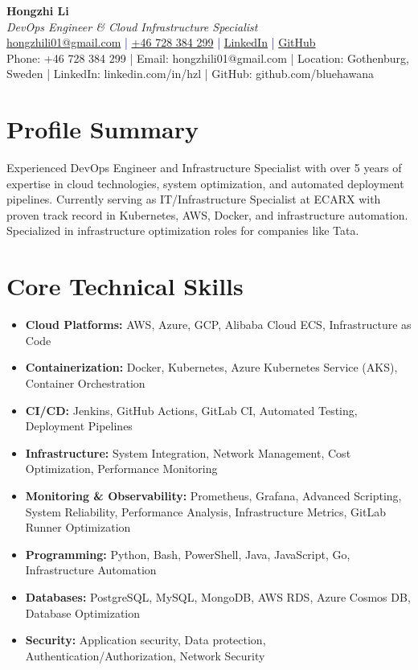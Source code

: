 \documentclass[11pt,a4paper]{article}
\begin{document}
\pagestyle{empty} %

\begin{center}
{\LARGE \textbf{Hongzhi Li}}\\[10pt]
{\Large \textit{DevOps Engineer \& Cloud Infrastructure Specialist}}\\[10pt]
\textcolor{darkblue}{\href{mailto:hongzhili01@gmail.com}{hongzhili01@gmail.com} | \href{tel:+46728384299}{+46 728 384 299} | \href{https://www.linkedin.com/in/hzl/}{LinkedIn} | \href{https://github.com/bluehawana}{GitHub}}
\\[6pt]
Phone: +46 728 384 299 | Email: hongzhili01@gmail.com | Location: Gothenburg, Sweden | LinkedIn: linkedin.com/in/hzl | GitHub: github.com/bluehawana
\end{center}

\section*{Profile Summary}
Experienced DevOps Engineer and Infrastructure Specialist with over 5 years of expertise in cloud technologies, system optimization, and automated deployment pipelines. Currently serving as IT/Infrastructure Specialist at ECARX with proven track record in Kubernetes, AWS, Docker, and infrastructure automation. Specialized in infrastructure optimization roles for companies like Tata.

\section*{Core Technical Skills}
\begin{itemize}[noitemsep]
\item \textbf{Cloud Platforms:} AWS, Azure, GCP, Alibaba Cloud ECS, Infrastructure as Code
\item \textbf{Containerization:} Docker, Kubernetes, Azure Kubernetes Service (AKS), Container Orchestration
\item \textbf{CI/CD:} Jenkins, GitHub Actions, GitLab CI, Automated Testing, Deployment Pipelines
\item \textbf{Infrastructure:} System Integration, Network Management, Cost Optimization, Performance Monitoring
\item \textbf{Monitoring \& Observability:} Prometheus, Grafana, Advanced Scripting, System Reliability, Performance Analysis, Infrastructure Metrics, GitLab Runner Optimization
\item \textbf{Programming:} Python, Bash, PowerShell, Java, JavaScript, Go, Infrastructure Automation
\item \textbf{Databases:} PostgreSQL, MySQL, MongoDB, AWS RDS, Azure Cosmos DB, Database Optimization
\item \textbf{Security:} Application security, Data protection, Authentication/Authorization, Network Security
\end{itemize}
\end{document}
